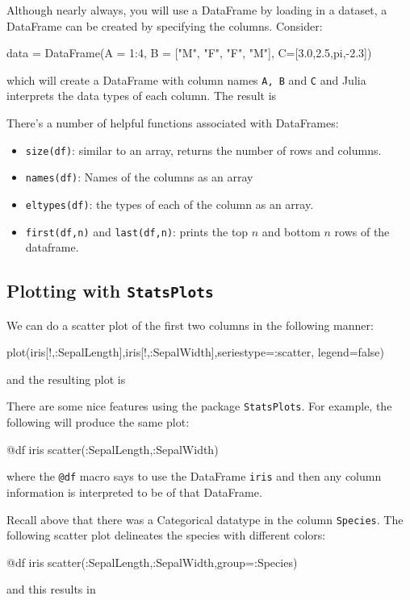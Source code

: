 Although nearly always, you will use a DataFrame by loading in a dataset, a DataFrame can be created by specifying the columns. Consider:
\begin{jlblock}[data]
data = DataFrame(A = 1:4, B = ["M", "F", "F", "M"], C=[3.0,2.5,pi,-2.3])
\end{jlblock}
which will create a DataFrame with column names \texttt{A, B} and \texttt{C} and Julia interprets the data types of each column.  The result is
 \printpythontex[verbatim]

There's a number of helpful functions
associated with DataFrames:
%
\begin{itemize}
\item \texttt{size(df)}: similar to an array, returns the number of rows and columns.
\item \texttt{names(df)}: Names of the columns as an array
\item \texttt{eltypes(df)}: the types of each of the column as an array.
\item \texttt{first(df,n)} and \texttt{last(df,n)}: prints the top $n$ and bottom $n$ rows of the dataframe.
\end{itemize}


\subsection{Plotting with \texttt{StatsPlots}}

We can do a scatter plot of the first two columns in the following manner:
\begin{jlblock}[data]
plot(iris[!,:SepalLength],iris[!,:SepalWidth],seriestype=:scatter, legend=false)
\end{jlblock}
and the resulting plot is
\begin{center}
\pgfplotsset{scale=0.7}
\end{center}

There are some nice features using the package \texttt{StatsPlots}.  For example, the following will produce the same plot:
\begin{jlblock}[data]
@df iris scatter(:SepalLength,:SepalWidth)
\end{jlblock}
where the \texttt{@df} macro says to use the DataFrame \texttt{iris} and then any column information is interpreted to be of that DataFrame. 

Recall above that there was a Categorical datatype in the column \texttt{Species}.  The following scatter plot delineates the species with different colors:
%
\begin{jlblock}[data]
@df iris scatter(:SepalLength,:SepalWidth,group=:Species)
\end{jlblock}
and this results in 
\begin{center}
\pgfplotsset{scale=0.8}
\end{center}


